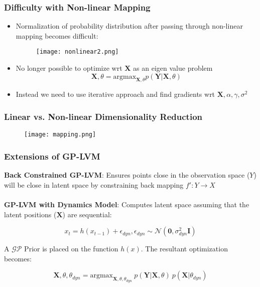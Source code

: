 \documentclass[10pt,handout]{beamer}
\begin{document}
\begin{frame}
\frametitle{Difficulty with Non-linear Mapping}

\begin{itemize}
  \item Normalization of probability distribution after passing through non-linear mapping becomes difficult:
    \begin{figure}
      \centering
      \texttt{[image: nonlinear2.png]}
    \end{figure}
    
  \item No longer possible to optimize wrt $\mathbf{X}$ as an eigen value problem
    \begin{equation}
      \mathbf{X},\theta = \text{argmax}_{\mathbf{X},\theta} p(\mathbf{Y}|\mathbf{X},\theta)
    \end{equation}

  \item Instead we need to use iterative approach and find gradients wrt $\mathbf{X},\alpha,\gamma,\sigma^2$ 
    
\end{itemize}

\end{frame}

\begin{frame}
\frametitle{Linear vs. Non-linear Dimensionality Reduction}

\begin{figure}
  \centering
  \texttt{[image: mapping.png]}
\end{figure}

\end{frame}

\begin{frame}
\frametitle{Extensions of GP-LVM}

\textbf{Back Constrained GP-LVM}: Ensures points close in the observation space ($Y$) will be close in latent space by constraining back mapping $f': Y \rightarrow X$\\~\\

\textbf{GP-LVM with Dynamics Model}: Computes latent space assuming that the latent positions ($\mathbf{X}$) are sequential:

\begin{equation}
  x_t = h(x_{t-1}) + \epsilon_{dyn}, \epsilon_{dyn} \sim \mathcal{N}(\mathbf{0},\sigma^2_{dyn}\mathbf{I})
\end{equation}

A $\mathcal{GP}$ Prior is placed on the function $h(x)$. The resultant optimization becomes:

\begin{equation}
  \mathbf{X},\theta,\theta_{dyn} = \text{argmax}_{\mathbf{X},\theta,\theta_{dyn}}~p(\mathbf{Y}|\mathbf{X},\theta)~p(\mathbf{X}|\theta_{dyn})
\end{equation}

\end{frame}
\end{document}
